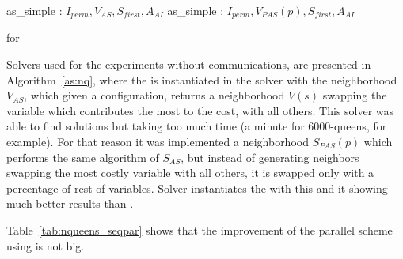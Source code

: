 \begin{algorithm}[H]
\dontprintsemicolon
\SetNoline
{}
   as\_simple\;
\algoindent {} : $I_{perm}, V_{AS}, S_{first}, A_{AI}$ \;
   as\_simple\;
\algoindent {} : $I_{perm}, V_{PAS}(p), S_{first}, A_{AI}$ \; 
\caption{\As{} for \NQP}\label{as:nq}
\end{algorithm}

Solvers used for the experiments without communications, are presented in Algorithm~\ref{as:nq}, where the \as{} is instantiated in the solver  with the neighborhood \om{} $V_{AS}$, which given a configuration, returns a neighborhood $V\left(s\right)$ swapping the variable which contributes the most to the cost, with all others. This solver was able to find solutions but taking too much time (a minute for 6000-queens, for example). For that reason it was implemented a neighborhood \om{} $S_{PAS}(p)$ which performs the same algorithm of $S_{AS}$, but instead of generating neighbors swapping the most costly variable with all others, it is swapped only with a percentage of rest of variables. Solver  instantiates the \as{} with this \om{} and it showing much better results than .

Table~\ref{tab:nqueens_seqpar} shows that the improvement of the parallel scheme using \posl{} is not big. 

